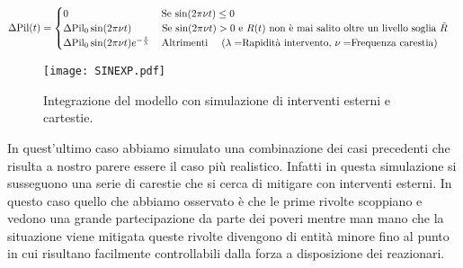 \begin{itemize}
\begin{equation}
	\Delta\text{Pil}(t)=
	\begin{cases}
		0 \qquad\qquad\qquad\qquad\quad \,\text{Se $ \sin(2\pi\nu t)\leq 0 $}\\
		\Delta\text{Pil}_0\sin(2\pi\nu t) \qquad \quad \text{Se $ \sin(2\pi\nu t)>0 $ e $R(t)$ non è mai salito oltre un livello soglia $\tilde{R}$}\\
		\Delta\text{Pil}_0\sin(2\pi\nu t)e^{-\frac{t}{\lambda}} \quad \, \text{Altrimenti}\quad     \text{ ($\lambda=$Rapidità intervento, $\nu=$Frequenza carestia)}
	\end{cases}
\end{equation}
\begin{figure}[H]
	\centering
	\texttt{[image: SINEXP.pdf]}
	\caption{Integrazione del modello con simulazione di interventi esterni e cartestie.}
\end{figure}
In quest'ultimo caso abbiamo simulato una combinazione dei casi precedenti che risulta a nostro parere essere il caso più realistico. Infatti in questa simulazione si susseguono una serie di carestie che si cerca di mitigare con interventi esterni. In questo caso quello che abbiamo osservato è che le prime rivolte scoppiano e vedono una grande partecipazione da parte dei poveri mentre man mano che la situazione viene mitigata queste rivolte divengono di entità minore fino al punto in cui risultano facilmente controllabili dalla forza a disposizione dei reazionari.
\end{itemize}
